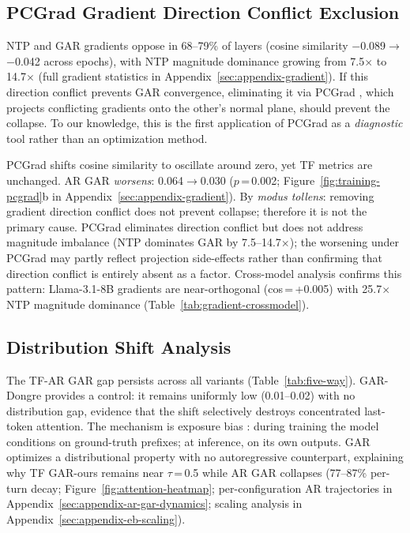 \subsection{PCGrad Gradient Direction Conflict Exclusion}\label{subsec:pcgrad}

NTP and GAR gradients oppose in 68--79\% of layers (cosine similarity $-$0.089$\to$$-$0.042 across epochs), with NTP magnitude dominance growing from 7.5$\times$ to 14.7$\times$ (full gradient statistics in Appendix~\ref{sec:appendix-gradient}). If this direction conflict prevents GAR convergence, eliminating it via PCGrad \citep{yu2020pcgrad}, which projects conflicting gradients onto the other's normal plane, should prevent the collapse. To our knowledge, this is the first application of PCGrad as a \emph{diagnostic} tool rather than an optimization method.

PCGrad shifts cosine similarity to oscillate around zero, yet TF metrics are unchanged. AR GAR \emph{worsens}: 0.064$\to$0.030 ($p$\,=\,0.002; Figure~\ref{fig:training-pcgrad}b in Appendix~\ref{sec:appendix-gradient}). By \emph{modus tollens}: removing gradient direction conflict does not prevent collapse; therefore it is not the primary cause. PCGrad eliminates direction conflict but does not address magnitude imbalance (NTP dominates GAR by 7.5--14.7$\times$); the worsening under PCGrad may partly reflect projection side-effects rather than confirming that direction conflict is entirely absent as a factor. Cross-model analysis confirms this pattern: Llama-3.1-8B gradients are near-orthogonal (cos\,=\,+0.005) with 25.7$\times$ NTP magnitude dominance (Table~\ref{tab:gradient-crossmodel}).

\subsection{Distribution Shift Analysis}\label{subsec:dist-shift}

The TF-AR GAR gap persists across all variants (Table~\ref{tab:five-way}). GAR-Dongre provides a control: it remains uniformly low (0.01--0.02) with no distribution gap, evidence that the shift selectively destroys concentrated last-token attention. The mechanism is exposure bias \citep{bengio2015scheduled,zhang2019bridging,arora2022exposure}: during training the model conditions on ground-truth prefixes; at inference, on its own outputs. GAR optimizes a distributional property with no autoregressive counterpart, explaining why TF GAR-ours remains near $\tau$\,=\,0.5 while AR GAR collapses (77--87\% per-turn decay; Figure~\ref{fig:attention-heatmap}; per-configuration AR trajectories in Appendix~\ref{sec:appendix-ar-gar-dynamics}; scaling analysis in Appendix~\ref{sec:appendix-eb-scaling}).

